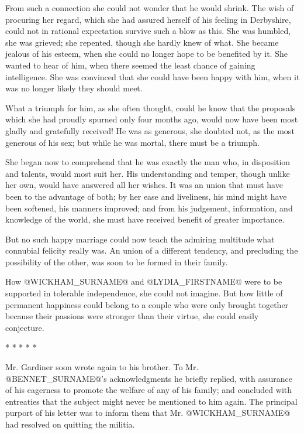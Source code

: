 From such a connection she could not wonder that he would shrink. The
wish of procuring her regard, which she had assured herself of his
feeling in Derbyshire, could not in rational expectation survive such a
blow as this. She was humbled, she was grieved; she repented, though she
hardly knew of what. She became jealous of his esteem, when she could no
longer hope to be benefited by it. She wanted to hear of him, when there
seemed the least chance of gaining intelligence. She was convinced that
she could have been happy with him, when it was no longer likely they
should meet.

What a triumph for him, as she often thought, could he know that the
proposals which she had proudly spurned only four months ago, would now
have been most gladly and gratefully received! He was as generous, she
doubted not, as the most generous of his sex; but while he was mortal,
there must be a triumph.

She began now to comprehend that he was exactly the man who, in
disposition and talents, would most suit her. His understanding and
temper, though unlike her own, would have answered all her wishes. It
was an union that must have been to the advantage of both; by her ease
and liveliness, his mind might have been softened, his manners improved;
and from his judgement, information, and knowledge of the world, she
must have received benefit of greater importance.

But no such happy marriage could now teach the admiring multitude what
connubial felicity really was. An union of a different tendency, and
precluding the possibility of the other, was soon to be formed in their
family.

How @WICKHAM_SURNAME@ and @LYDIA_FIRSTNAME@ were to be supported in tolerable independence,
she could not imagine. But how little of permanent happiness could
belong to a couple who were only brought together because their passions
were stronger than their virtue, she could easily conjecture.

                          * * * * *

Mr. Gardiner soon wrote again to his brother. To Mr. @BENNET_SURNAME@'s
acknowledgments he briefly replied, with assurance of his eagerness to
promote the welfare of any of his family; and concluded with entreaties
that the subject might never be mentioned to him again. The principal
purport of his letter was to inform them that Mr. @WICKHAM_SURNAME@ had resolved
on quitting the militia.

